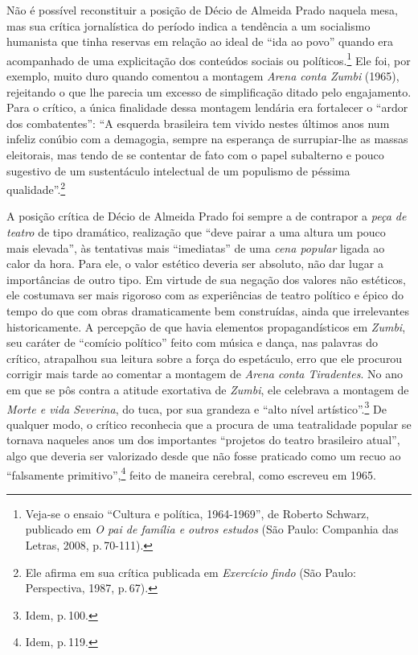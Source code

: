 Não é possível reconstituir a posição de Décio de Almeida Prado naquela
mesa, mas sua crítica jornalística do período indica a tendência a um
socialismo humanista que tinha reservas em relação ao ideal de “ida ao
povo” quando era acompanhado de uma explicitação dos conteúdos sociais
ou políticos.\footnote{Veja-se o ensaio “Cultura e política, 1964-1969”,
  de Roberto Schwarz, publicado em {\it O pai de família e outros
  estudos} (São Paulo: Companhia das Letras, 2008, p.\,70-111).} Ele foi,
por exemplo, muito duro quando comentou a montagem {\it Arena conta
Zumbi} (1965), rejeitando o que lhe parecia um excesso de simplificação
ditado pelo engajamento. Para o crítico, a única finalidade dessa
montagem lendária era fortalecer o “ardor dos combatentes”: “A esquerda
brasileira tem vivido nestes últimos anos num infeliz conúbio com a
demagogia, sempre na esperança de surrupiar-lhe as massas eleitorais,
mas tendo de se contentar de fato com o papel subalterno e pouco
sugestivo de um sustentáculo intelectual de um populismo de péssima
qualidade”.\footnote{Ele afirma em sua crítica publicada em
  {\it Exercício findo} (São Paulo: Perspectiva, 1987, p.\,67).}

A posição crítica de Décio de Almeida Prado foi sempre a de contrapor a
{\it peça de teatro} de tipo dramático, realização que “deve pairar a
uma altura um pouco mais elevada”, às tentativas mais “imediatas” de uma
{\it cena popular} ligada ao calor da hora. Para ele, o valor estético
deveria ser absoluto, não dar lugar a importâncias de outro tipo. Em
virtude de sua negação dos valores não estéticos, ele costumava ser mais
rigoroso com as experiências de teatro político e épico do tempo do que
com obras dramaticamente bem construídas, ainda que irrelevantes
historicamente. A percepção de que havia elementos propagandísticos em
{\it Zumbi}, seu caráter de “comício político” feito com música e
dança, nas palavras do crítico, atrapalhou sua leitura sobre a força do
espetáculo, erro que ele procurou corrigir mais tarde ao comentar a
montagem de {\it Arena conta Tiradentes}. No ano em que se pôs contra a
atitude exortativa de {\it Zumbi}, ele celebrava a montagem
de {\it Morte e vida Severina}, do {\sc tuca}, por sua grandeza e “alto nível
artístico”.\footnote{Idem, p.\,100.} De qualquer modo, o crítico
reconhecia que a procura de uma teatralidade popular se tornava naqueles
anos um dos importantes “projetos do teatro brasileiro atual”, algo que
deveria ser valorizado desde que não fosse praticado como um recuo ao
“falsamente primitivo”,\footnote{Idem, p.\,119.} feito de maneira
cerebral, como escreveu em 1965.


